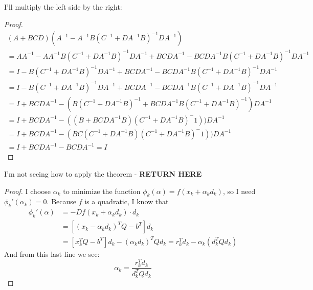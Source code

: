 \documentclass[12pt]{article}
\newenvironment{problem}[2][Problem]{\begin{trivlist}
\item[\hskip \labelsep {\bfseries #1}\hskip \labelsep {\bfseries #2.}]}{\end{trivlist}}
\theoremstyle{definition}
\theoremstyle{definition}
\theoremstyle{definition}
\theoremstyle{definition}
\begin{document}
\begin{problem}{9.15} I'll multiply the left side by the right: 
\begin{proof}
\begin{align*}
(A+BCD)(A^{-1} - A^{-1}B(C^{-1} + DA^{-1}B)^{-1}DA^{-1}) \\
= AA^{-1} - AA^{-1}B(C^{-1} + DA^{-1}B)^{-1}DA^{-1} + BCDA^{-1} - BCDA^{-1}B(C^{-1} + DA^{-1}B)^{-1}DA^{-1} \\
= I - B(C^{-1} + DA^{-1}B)^{-1}DA^{-1} + BCDA^{-1} - BCDA^{-1}B(C^{-1} + DA^{-1}B)^{-1}DA^{-1} \\
= I - B(C^{-1} + DA^{-1}B)^{-1}DA^{-1} + BCDA^{-1} - BCDA^{-1}B(C^{-1} + DA^{-1}B)^{-1}DA^{-1} \\
= I + BCDA^{-1} - (B(C^{-1} + DA^{-1}B)^{-1} + BCDA^{-1}B(C^{-1} + DA^{-1}B)^{-1})DA^{-1} \\
= I + BCDA^{-1} - ((B+BCDA^{-1}B)(C^{-1} + DA^{-1}B)^-{1}))DA^{-1} \\
= I + BCDA^{-1} - (BC(C^{-1}+DA^{-1}B)(C^{-1} + DA^{-1}B)^-{1}))DA^{-1} \\
= I + BCDA^{-1} - BCDA^{-1}
= I
\end{align*}

\end{proof}
\end{problem}

\begin{problem}{9.16}
I'm not seeing how to apply the theorem - \textbf{RETURN HERE}
\end{problem}

\begin{problem}{9.18}
\begin{proof}
I choose $\alpha_k$ to minimize the function $\phi_k(\alpha) = f(x_k + \alpha_k d_k)$, so I need $\phi_k'(\alpha_k) = 0$. Because $f$ is a quadratic, I know that 
\begin{align*}
\phi_k'(\alpha) &= - Df(x_k + \alpha_k d_k) \cdot d_k \\
&=[(x_k - \alpha_k d_k)^T Q - b^T] d_k \\
&= [x_k^TQ - b^T]d_k - (\alpha_kd_k)^TQd_k
= r_k^Td_k - \alpha_k(d_k^TQd_k)
\end{align*}
And from this last line we see:
$$
\alpha_k = \frac{r_k^Td_k}{d_k^TQd_k}
$$
\end{proof}
\end{problem}
\end{document}
